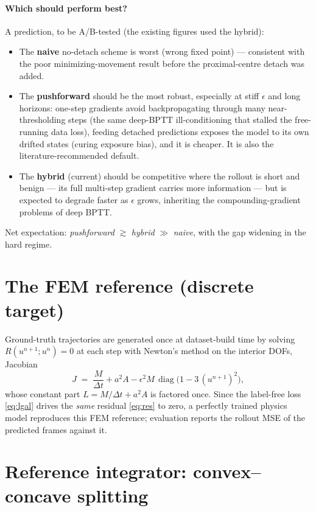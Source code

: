 \documentclass[11pt]{article}
\newcommand{\dt}{\Delta t}
\DeclareMathOperator{\diag}{diag}
\begin{document}
\paragraph{Which should perform best?} A prediction, to be A/B-tested (the existing figures used the
hybrid):
\begin{itemize}\itemsep2pt
  \item The \textbf{naive} no-detach scheme is worst (wrong fixed point) --- consistent with the poor
        minimizing-movement result before the proximal-centre detach was added.
  \item The \textbf{pushforward} should be the most robust, especially at stiff $\epsilon$ and long
        horizons: one-step gradients avoid backpropagating through many near-thresholding steps (the
        same deep-BPTT ill-conditioning that stalled the free-running data loss), feeding detached
        predictions exposes the model to its own drifted states (curing exposure bias), and it is
        cheaper. It is also the literature-recommended default.
  \item The \textbf{hybrid} (current) should be competitive where the rollout is short and benign ---
        its full multi-step gradient carries more information --- but is expected to degrade faster as
        $\epsilon$ grows, inheriting the compounding-gradient problems of deep BPTT.
\end{itemize}
\noindent Net expectation: \emph{pushforward} $\gtrsim$ \emph{hybrid} $\gg$ \emph{naive}, with the
gap widening in the hard regime.

\section{The FEM reference (discrete target)}
\label{sec:ref}

Ground-truth trajectories are generated once at dataset-build time by solving
$R(u^{n+1};u^{n})=0$ at each step with Newton's method on the interior DOFs, Jacobian
\begin{equation}
  J \;=\; \frac{M}{\dt} + a^2 A - \epsilon^2 M\,\diag\!\big(1-3\,(u^{n+1})^2\big),
\end{equation}
whose constant part $L=M/\dt+a^2A$ is factored once. Since the label-free loss
\eqref{eq:lgal} drives the \emph{same} residual \eqref{eq:res} to zero, a perfectly trained
physics model reproduces this FEM reference; evaluation reports the rollout MSE of the
predicted frames against it.

\section{Reference integrator: convex--concave splitting}
\label{sec:cc}
\end{document}
